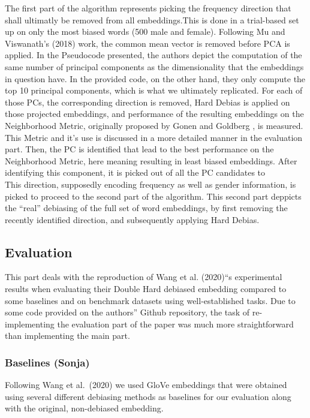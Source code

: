 \documentclass[
  english,
  man,floatsintext]{apa6}
\begin{document}
The first part of the algorithm represents picking the frequency direction that shall ultimatly be removed from all embeddings.This is done in a trial-based set up on only the most biased words (500 male and female). Following Mu and Viswanath's (2018) work, the common mean vector is removed before PCA is applied.
In the Pseudocode presented, the authors depict the computation of the same number of principal components as the dimensionality that the embeddings in question have. In the provided code, on the other hand, they only compute the top 10 principal components, which is what we ultimately replicated.
For each of those PCs, the corresponding direction is removed, Hard Debias is applied on those projected embeddings, and performance of the resulting embeddings on the Neighborhood Metric, originally proposed by Gonen and Goldberg , is measured. This Metric and it's use is discussed in a more detailed manner in the evaluation part.
Then, the PC is identified that lead to the best performance on the Neighborhood Metric, here meaning resulting in least biased embeddings.
After identifying this component, it is picked out of all the PC candidates to\\
This direction, supposedly encoding frequency as well as gender information, is picked to proceed to the second part of the algorithm.
This second part deppicts the \enquote{real} debiasing of the full set of word embeddings, by first removing the recently identified direction, and subsequently applying Hard Debias.

\hypertarget{evaluation}{%
\subsection{Evaluation}\label{evaluation}}

This part deals with the reproduction of Wang et al. (2020)\enquote{s experimental results when evaluating their Double Hard debiased embedding compared to some baselines and on benchmark datasets using well-established tasks. Due to some code provided on the authors} Github repository, the task of re-implementing the evaluation part of the paper was much more straightforward than implementing the main part.

\hypertarget{baselines-sonja}{%
\subsubsection{Baselines (Sonja)}\label{baselines-sonja}}

Following Wang et al.~(2020) we used GloVe embeddings that were obtained using several different debiasing methods as baselines for our evaluation along with the original, non-debiased embedding.
\end{document}
